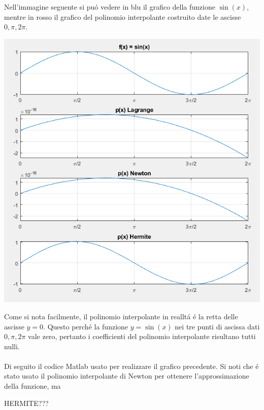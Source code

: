 \begin{center}
\footnotesize\noindent{}\end{center}

\noindent Nell'immagine seguente si pu\'o vedere in blu il grafico della funzione \(\sin(x)\), mentre in rosso il grafico del polinomio interpolante costruito date le ascisse \(0, \pi, 2\pi \).
\begin{center}
	\includegraphics[scale=0.7]{cap4/4_4.png}
\end{center}
\noindent Come si nota facilmente, il polinomio interpolante in reallt\'a \'e la retta delle ascisse \(y=0\). Questo perch\'e la funzione \(y = \sin(x)\) nei tre punti di ascissa dati \(0, \pi, 2\pi \) vale zero, pertanto i coefficienti del polinomio interpolante risultano tutti nulli. \\ \\
\noindent Di seguito il codice Matlab usato per realizzare il grafico precedente. Si noti che \'e stato usato il polinomio interpolante di Newton per ottenere l'approssimazione della funzione, ma

HERMITE???
